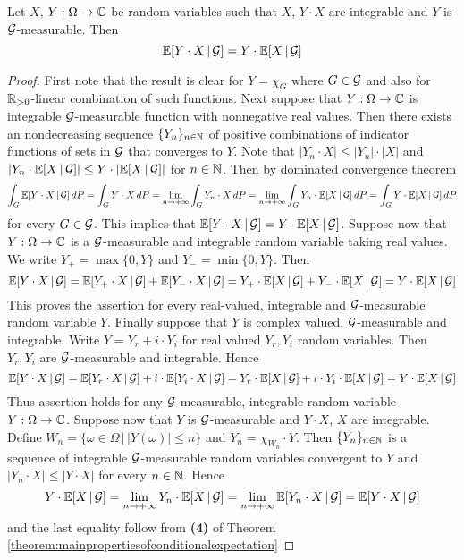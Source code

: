 \begin{theorem}\label{theorem:multiplicationofconditionalexpectation}
Let $X$, $Y:\Omega \rightarrow {\mathbb C}$ be random variables such that $X$, $Y\cdot X$ are integrable and $Y$ is ${\mathcal G}$-measurable. Then
$${\mathbb E}[Y\cdot X\,|\,{\mathcal G}] = Y\cdot {\mathbb E}[X\,|\,{\mathcal G}]$$
\end{theorem}
\begin{proof}
First note that the result is clear for $Y = \chi_G$ where $G\in {\mathcal G}$ and also for ${\mathbb R}_{>0}$-linear combination of such functions. Next suppose that $Y:\Omega \rightarrow {\mathbb C}$ is integrable ${\mathcal G}$-measurable function with nonnegative real values. Then there exists an nondecreasing sequence $\{Y_n\}_{n\in {\mathbb N}}$ of positive combinations of indicator functions of sets in ${\mathcal G}$ that converges to $Y$. Note that $|Y_n\cdot X|\leq |Y_n|\cdot |X|$ and $|Y_n\cdot {\mathbb E}[X\,|\,{\mathcal G}]|\leq Y\cdot |{\mathbb E}[X\,|\,{\mathcal G}]|$ for $n\in {\mathbb N}$. Then by dominated convergence theorem
$$\int_G {\mathbb E}[Y\cdot X\,|\,{\mathcal G}]\,dP = \int_G Y\cdot X\,dP = \lim_{n\rightarrow +\infty}\int_G Y_n\cdot X\,dP = \lim_{n\rightarrow +\infty} \int_G Y_n\cdot {\mathbb E}[X\,|\,{\mathcal G}]\,dP = \int_G Y\cdot {\mathbb E}[X\,|\,{\mathcal G}]\,dP$$
for every $G\in {\mathcal G}$. This implies that ${\mathbb E}[Y\cdot X\,|\,{\mathcal G}] = Y\cdot {\mathbb E}[X\,|\,{\mathcal G}]$. Suppose now that $Y:\Omega \rightarrow {\mathbb C}$ is a ${\mathcal G}$-measurable and integrable random variable taking real values. We write $Y_+ = \max\{0,Y\}$ and $Y_- = \min\{0,Y\}$. Then
$${\mathbb E}[Y\cdot X\,|\,{\mathcal G}] = {\mathbb E}[Y_+\cdot X\,|\,{\mathcal G}]+{\mathbb E}[Y_-\cdot X\,|\,{\mathcal G}]= Y_+\cdot{\mathbb E}[ X\,|\,{\mathcal G}] + Y_-\cdot{\mathbb E}[ X\,|\,{\mathcal G}] = Y\cdot {\mathbb E}[X\,|\,{\mathcal G}]$$
This proves the assertion for every real-valued, integrable and ${\mathcal G}$-measurable random variable $Y$. Finally suppose that $Y$ is complex valued, ${\mathcal G}$-measurable and integrable. Write $Y = Y_r + i\cdot Y_i$ for real valued $Y_r, Y_i$ random variables. Then $Y_r, Y_i$ are ${\mathcal G}$-measurable and integrable. Hence
$${\mathbb E}[Y\cdot X\,|\,{\mathcal G}] = {\mathbb E}[Y_r\cdot X\,|\,{\mathcal G}]+i\cdot {\mathbb E}[Y_i\cdot X\,|\,{\mathcal G}]= Y_r\cdot{\mathbb E}[ X\,|\,{\mathcal G}] +i\cdot Y_i\cdot{\mathbb E}[ X\,|\,{\mathcal G}] = Y\cdot {\mathbb E}[X\,|\,{\mathcal G}]$$
Thus assertion holds for any ${\mathcal G}$-measurable, integrable random variable $Y:\Omega \rightarrow {\mathbb C}$. Suppose now that $Y$ is ${\mathcal G}$-measurable and $Y\cdot X$, $X$ are integrable. Define $W_n=\{\omega \in \Omega\,|\,|Y(\omega)|\leq n\}$ and $Y_n = \chi_{W_n}\cdot Y$. Then $\{Y_n\}_{n\in {\mathbb N}}$ is a sequence of integrable ${\mathcal G}$-measurable random variables convergent to $Y$ and $|Y_n\cdot X|\leq |Y\cdot X|$ for every $n\in {\mathbb N}$. Hence
$$Y\cdot {\mathbb E}[X\,|\,{\mathcal G}] = \lim_{n\rightarrow +\infty}Y_n\cdot {\mathbb E}[X\,|\,{\mathcal G}] = \lim_{n\rightarrow +\infty}{\mathbb E}[Y_n\cdot X\,|\,{\mathcal G}] = {\mathbb E}[Y\cdot X\,|\,{\mathcal G}]$$
and the last equality follow from \textbf{(4)} of Theorem \ref{theorem:mainpropertiesofconditionalexpectation}
\end{proof}

